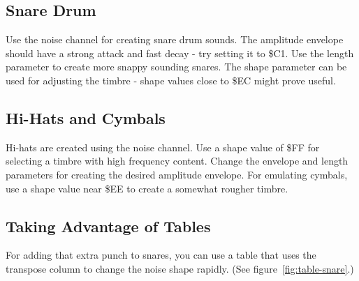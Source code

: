 \subsection{Snare Drum}

Use the noise channel for creating snare drum sounds. The amplitude envelope should have a strong attack and fast decay - try setting it to \$C1. Use the length parameter to create more snappy sounding snares. The shape parameter can be used for adjusting the timbre - shape values close to \$EC might prove useful.

\subsection{Hi-Hats and Cymbals}

Hi-hats are created using the noise channel. Use a shape value of \$FF for selecting a timbre with high frequency content. Change the envelope and length parameters for creating the desired amplitude envelope. For emulating cymbals, use a shape value near \$EE to create a somewhat rougher timbre.

\subsection{Taking Advantage of Tables}

For adding that extra punch to snares, you can use a table that uses the transpose column to change the noise shape rapidly. (See figure~\ref{fig:table-snare}.)



